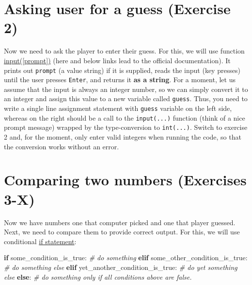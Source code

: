 \documentclass[
]{book}
\newenvironment{Shaded}{\begin{snugshade}}{\end{snugshade}}
\newcommand{\CommentTok}[1]{\textcolor[rgb]{0.56,0.35,0.01}{\textit{#1}}}
\newcommand{\ControlFlowTok}[1]{\textcolor[rgb]{0.13,0.29,0.53}{\textbf{#1}}}
\newcommand{\NormalTok}[1]{#1}
\begin{document}
\hypertarget{input-function}{%
\section{Asking user for a guess (Exercise 2)}\label{input-function}}

Now we need to ask the player to enter their guess. For this, we will use function \href{https://docs.python.org/3/library/functions.html\#input}{input({[}prompt{]})} (here and below links lead to the official documentation). It prints out \texttt{prompt} (a value string) if it is supplied, reads the input (key presses) until the user presses \texttt{Enter}, and returns it \textbf{as a string}. For a moment, let us assume that the input is always an integer number, so we can simply convert it to an integer and assign this value to a new variable called \texttt{guess}. Thus, you need to write a single line assignment statement with \texttt{guess} variable on the left side, whereas on the right should be a call to the \texttt{input(...)} function (think of a nice prompt message) wrapped by the type-conversion to \texttt{int(...)}. Switch to exercise 2 and, for the moment, only enter valid integers when running the code, so that the conversion works without an error.

\hypertarget{comparing-two-numbers-exercises-3-x}{%
\section{Comparing two numbers (Exercises 3-X)}\label{comparing-two-numbers-exercises-3-x}}

Now we have numbers one that computer picked and one that player guessed. Next, we need to compare them to provide correct output. For this, we will use conditional \href{https://docs.python.org/3/tutorial/controlflow.html\#if-statements}{if statement}:

\begin{Shaded}
\begin{Highlighting}[]
\ControlFlowTok{if}\NormalTok{ some\_condition\_is\_true:}
  \CommentTok{\# do something}
\ControlFlowTok{elif}\NormalTok{ some\_other\_condition\_is\_true:}
  \CommentTok{\# do something else}
\ControlFlowTok{elif}\NormalTok{ yet\_another\_condition\_is\_true:}
  \CommentTok{\# do yet something else}
\ControlFlowTok{else}\NormalTok{:}
  \CommentTok{\# do something only if all conditions above are false.}
\end{Highlighting}
\end{Shaded}
\end{document}
